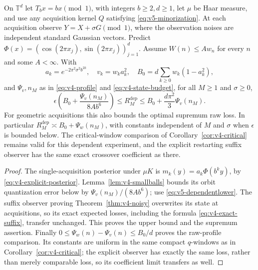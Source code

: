\begin{corollary}
\label{cor:v5-dependentnoise}
On $\mathbb T^d$ let $T_bx=bx\pmod1$, with integers $b\ge2,d\ge1$,
let $\mu$ be Haar measure, and use any acquisition kernel $Q$
satisfying \eqref{eq:v5-minorization}. At each acquisition observe
$Y=X+\sigma G\pmod1$, where the observation noises are independent
standard Gaussian vectors. Predict
$\Phi(x)=(\cos(2\pi x_j),\sin(2\pi x_j))_{j=1}^d$.
Assume $W(n)\le Aw_n$ for every $n$ and some $A<\infty$.
With
\[
 a_k=e^{-2\pi^2\sigma^2b^{2k}},\quad v_k=w_ka_k^2,\quad
 B_0=d\sum_{k\ge0}w_k(1-a_k^2),
\]
and $\Psi_v,n_M$ as in \eqref{eq:v4-profile} and
\eqref{eq:v4-state-budget}, for all $M\ge1$ and $\sigma\ge0$,
\begin{equation}\label{eq:v5-dependentnoisybound}
 \epsilon\left(B_0+\frac{\Psi_v(n_M)}{8Ab^6}\right)
 \le R_M^{\mathrm{dep}}
 \le B_0+\frac{d\pi^2}{3}\Psi_v(n_M).
\end{equation}
For geometric acquisitions this also bounds the optimal supremum
raw loss. In particular $R_M^{\mathrm{dep}}\asymp B_0+\Psi_w(n_M)$,
with constants independent of $M$ and $\sigma$ when
$\epsilon$ is bounded below. The critical-window comparison of
Corollary~\ref{cor:v4-critical} remains valid for this dependent
experiment, and the explicit restarting suffix observer has the
same exact crossover coefficient as there.
\end{corollary}

\begin{proof}
The single-acquisition posterior under $\mu K$ is
$m_k(y)=a_k\Phi(b^ky)$, by \eqref{eq:v4-explicit-posterior}.
Lemma~\ref{lem:v4-smallballs} bounds its orbit quantization error
below by $\Psi_v(n_M)/(8Ab^6)$; use
\eqref{eq:v5-dependentlower}. The suffix observer proving
Theorem~\ref{thm:v4-noisy} overwrites its state at acquisitions,
so its exact expected losses, including the formula
\eqref{eq:v4-exact-suffix}, transfer unchanged. This proves the
upper bound and the supremum assertion. Finally
$0\le\Psi_w(n)-\Psi_v(n)\le B_0/d$ proves the raw-profile
comparison. Its constants are uniform in the same compact
$q$-windows as in Corollary~\ref{cor:v4-critical}; the explicit
observer has exactly the same loss, rather than merely comparable
loss, so its coefficient limit transfers as well.
\end{proof}

